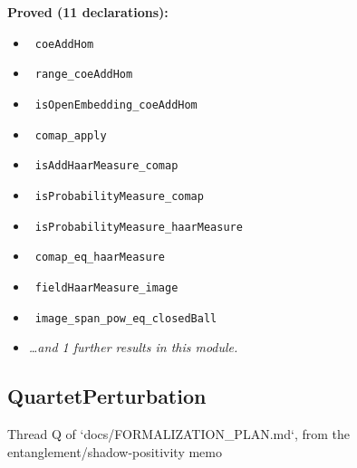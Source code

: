 \documentclass{report}
\theoremstyle{definition}
\begin{document}
\noindent\textbf{Proved (11 declarations):}
\begin{itemize}
  \item {}\leanok\ \texttt{coeAddHom}
  \item {}\leanok\ \texttt{range\_coeAddHom}
  \item {}\leanok\ \texttt{isOpenEmbedding\_coeAddHom}
  \item {}\leanok\ \texttt{comap\_apply}
  \item {}\leanok\ \texttt{isAddHaarMeasure\_comap}
  \item {}\leanok\ \texttt{isProbabilityMeasure\_comap}
  \item {}\leanok\ \texttt{isProbabilityMeasure\_haarMeasure}
  \item {}\leanok\ \texttt{comap\_eq\_haarMeasure}
  \item {}\leanok\ \texttt{fieldHaarMeasure\_image}
  \item {}\leanok\ \texttt{image\_span\_pow\_eq\_closedBall}
  \item \emph{\ldots and 1 further results in this module.}
\end{itemize}

\subsection{QuartetPerturbation}
Thread Q of `docs/FORMALIZATION\_PLAN.md`, from the entanglement/shadow-positivity memo
\end{document}
